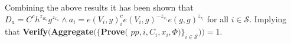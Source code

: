Combining the above results it has been shown that $D_a  = C^ch^{z_R_a}g^{z_x_a}\wedge a_i = e(V_i,y)^c_i e(V_i,g)^{-z_{x_i}}e(g,g)^{z_{\tau_i}}$ for all $i\in\mathcal{S}$.
Implying that \textbf{Verify}$ ( $\textbf{Aggregate}$ (\{ $\textbf{Prove}$($
$pp,i,C_i,x_i,\Phi)\}_{i\in\mathcal{S}}) )= 1$.



